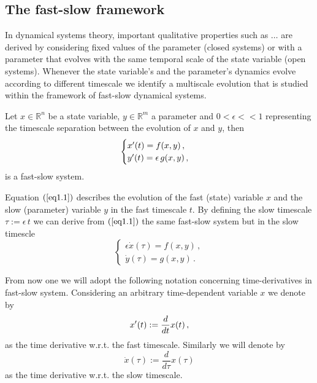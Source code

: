 \documentclass[../main.tex]{subfiles}
\begin{document}
\subsection{The fast-slow framework}\label{subsec2.1}
In dynamical systems theory, important qualitative properties such as $\dots$ are derived by considering fixed values of the parameter (closed systems) or with a parameter that evolves with the same temporal scale of the state variable (open systems). Whenever the state variable's and the parameter's dynamics evolve according to different timescale we identify a multiscale evolution that is studied within the framework of fast-slow dynamical systems. 
\begin{definition}\label{def1.1}
     Let $x\in \mathbb{R}^{n}$ be a state variable, $y\in \mathbb{R}^{m}$ a parameter and $0<\epsilon<<1$ representing the timescale separation between the evolution of $x$ and $y$, then
     \begin{equation}\label{eq1.1}
        \begin{cases}
                x'(t) = f(x,y) \,, \\
                y'(t) = \epsilon\,g(x,y) \,, 
        \end{cases}
     \end{equation}
    is a fast-slow system.
\end{definition}
Equation $(\ref{eq1.1})$ describes the evolution of the fast (state) variable $x$ and the slow (parameter) variable $y$ in the fast timescale $t$.
By defining the slow timescale $\tau := \epsilon\,t$ we can derive from $(\ref{eq1.1})$ the same fast-slow system but in the slow timescle
\begin{equation}\label{eq1.2}
        \begin{cases}
                \epsilon\dot{x}(\tau) = f(x,y)\,, \\
                \dot{y}(\tau) = g(x,y)\,.
        \end{cases}
\end{equation}
\begin{interpretation*}{}
     From now one we will adopt the following notation concerning time-derivatives in fast-slow system. Considering an arbitrary time-dependent variable $x$ we denote by
     \begin{equation*}
         x'(t):=\frac{d}{dt}x(t)\,,
     \end{equation*}
     as the time derivative w.r.t. the fast timescale. Similarly we will denote by
     \begin{equation*}
             \dot{x}(\tau):=\frac{d}{d\tau}x(\tau) 
     \end{equation*}
     as the time derivative w.r.t. the slow timescale.
\end{interpretation*}
\end{document}
